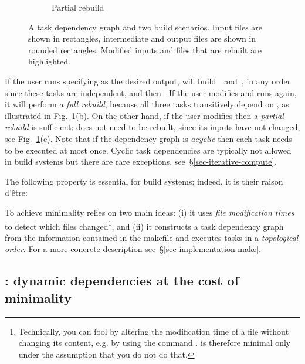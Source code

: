 \begin{figure}[h]
\begin{subfigure}[b]{0.32\linewidth}
\caption{Partial rebuild}
\end{subfigure}
\vspace{-2mm}
\caption{A task dependency graph and two build scenarios. Input files are shown
in rectangles, intermediate and output files are shown in rounded rectangles.
Modified inputs and files that are rebuilt are highlighted.
\label{fig-make}}
\vspace{-2mm}
\end{figure}

If the user runs \Make specifying  as the desired output, \Make
will build~~and~, in any order since these tasks are
independent, and then . If the user modifies  and runs
\Make again, it will perform a \emph{full rebuild}, because all three tasks
transitively depend on , as illustrated in Fig.~\ref{fig-make}(b).
On the other hand, if the user modifies  then a \emph{partial
rebuild} is sufficient:  does not need to be rebuilt, since its
inputs have not changed, see Fig.~\ref{fig-make}(c). Note that if the dependency
graph is \emph{acyclic} then each task needs to be executed at most once. Cyclic
task dependencies are typically not allowed in build systems but there are rare
exceptions, see~\S\ref{sec-iterative-compute}.

\noindent
The following property is essential for build systems; indeed, it is their
raison d'\^etre:

\label{def-minimal}
\vspace{2mm}

To achieve minimality \Make relies on two main ideas: (i) it uses \emph{file
modification times} to detect which files changed\footnote{Technically, you
can fool \Make by altering the modification time of a file without changing its
content, e.g. by using the command . \Make is therefore minimal only
under the assumption that you do not do that.}, and (ii) it constructs a task
dependency graph from the information contained in the makefile and executes
tasks in a \emph{topological order}. For a more concrete description
see~\S\ref{sec-implementation-make}.

\subsection{\Excel: dynamic dependencies at the cost of minimality}
\label{sec-background-excel}


